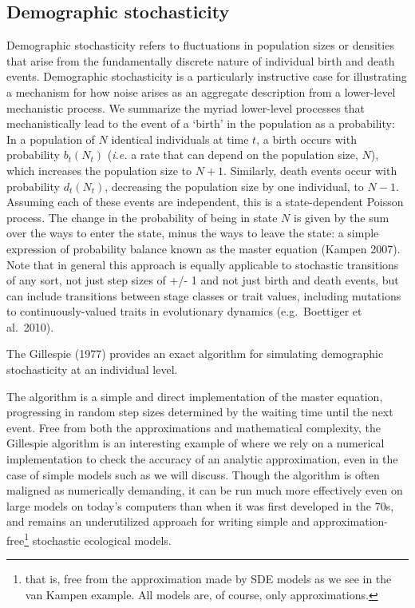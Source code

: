 \documentclass[
  authoryear,
  preprint]{elsarticle}
\begin{document}
\subsection{Demographic stochasticity}\label{demographic-stochasticity}

Demographic stochasticity refers to fluctuations in population sizes or
densities that arise from the fundamentally discrete nature of
individual birth and death events. Demographic stochasticity is a
particularly instructive case for illustrating a mechanism for how noise
arises as an aggregate description from a lower-level mechanistic
process. We summarize the myriad lower-level processes that
mechanistically lead to the event of a `birth' in the population as a
probability: In a population of \(N\) identical individuals at time
\(t\), a birth occurs with probability \(b_t(N_t)\) (\emph{i.e.} a rate
that can depend on the population size, \(N\)), which increases the
population size to \(N+1\). Similarly, death events occur with
probability \(d_t(N_t)\), decreasing the population size by one
individual, to \(N-1\). Assuming each of these events are independent,
this is a state-dependent Poisson process. The change in the probability
of being in state \(N\) is given by the sum over the ways to enter the
state, minus the ways to leave the state: a simple expression of
probability balance known as the master equation (Kampen 2007). Note
that in general this approach is equally applicable to stochastic
transitions of any sort, not just step sizes of +/- 1 and not just birth
and death events, but can include transitions between stage classes or
trait values, including mutations to continuously-valued traits in
evolutionary dynamics (e.g.~Boettiger et al.~2010).

The Gillespie (1977) provides an exact algorithm for simulating
demographic stochasticity at an individual level.

The algorithm is a simple and direct implementation of the master
equation, progressing in random step sizes determined by the waiting
time until the next event. Free from both the approximations and
mathematical complexity, the Gillespie algorithm is an interesting
example of where we rely on a numerical implementation to check the
accuracy of an analytic approximation, even in the case of simple models
such as we will discuss. Though the algorithm is often maligned as
numerically demanding, it can be run much more effectively even on large
models on today's computers than when it was first developed in the 70s,
and remains an underutilized approach for writing simple and
approximation-free\footnote{that is, free from the approximation made by
  SDE models as we see in the van Kampen example. All models are, of
  course, only approximations.} stochastic ecological models.
\end{document}
